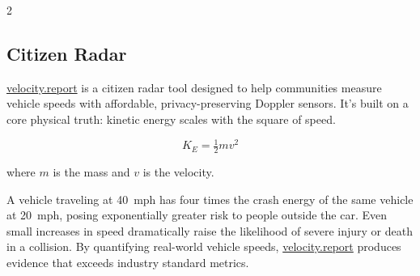 \documentclass[10pt,letterpaper]{article}
\begin{document}
\begin{multicols}{2}
\subsection*{Citizen Radar}
\href{https://velocity.report}{velocity.report} is a citizen radar tool designed to help communities measure vehicle speeds with affordable, privacy-preserving Doppler sensors. It's built on a core physical truth: kinetic energy scales with the square of speed.
\par
\begin{minipage}{\linewidth}
\[ K_E = \tfrac{1}{2} m v^2 \]
\par
\begin{center}
where \(m\) is the mass and \(v\) is the velocity.
\end{center}
\end{minipage}
\par
\vspace{4pt}
A vehicle traveling at 40~mph has four times the crash energy of the same vehicle at 20~mph, posing exponentially greater risk to people outside the car. Even small increases in speed dramatically raise the likelihood of severe injury or death in a collision. By quantifying real-world vehicle speeds, \href{https://velocity.report}{velocity.report} produces evidence that exceeds industry standard metrics.
\par

\end{multicols}
\end{document}
